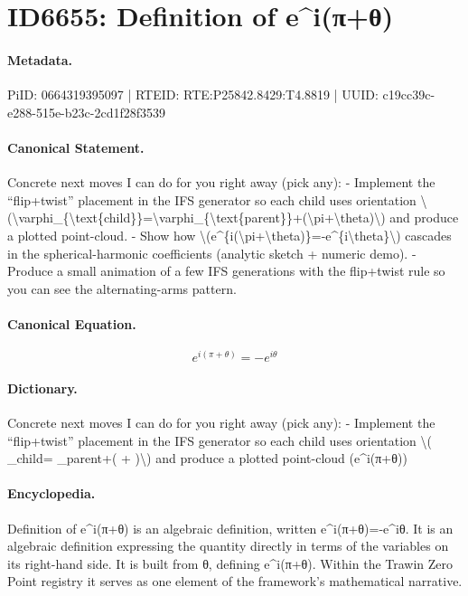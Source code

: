 \section*{ID6655: Definition of e\textasciicircum{}i(π+θ)}
\paragraph{Metadata.}
PiID: 0664319395097 | RTEID: RTE:P25842.8429:T4.8819 | UUID: c19cc39c-e288-515e-b23c-2cd1f28f3539

\paragraph{Canonical Statement.}
Concrete next moves I can do for you right away (pick any): - Implement the “flip+twist” placement in the IFS generator so each child uses orientation \textbackslash{}(\textbackslash{}varphi\_\{\textbackslash{}text\{child\}\}=\textbackslash{}varphi\_\{\textbackslash{}text\{parent\}\}+(\textbackslash{}pi+\textbackslash{}theta)\textbackslash{}) and produce a plotted point-cloud. - Show how \textbackslash{}(e\textasciicircum{}\{i(\textbackslash{}pi+\textbackslash{}theta)\}=-e\textasciicircum{}\{i\textbackslash{}theta\}\textbackslash{}) cascades in the spherical-harmonic coefficients (analytic sketch + numeric demo). - Produce a small animation of a few IFS generations with the flip+twist rule so you can see the alternating-arms pattern.

\paragraph{Canonical Equation.}
\[
e^{i(\pi+\theta)}=-e^{i\theta}
\]

\paragraph{Dictionary.}
Concrete next moves I can do for you right away (pick any): - Implement the “flip+twist” placement in the IFS generator so each child uses orientation \textbackslash{}( \_child= \_parent+( + )\textbackslash{}) and produce a plotted point-cloud (e\textasciicircum{}i(π+θ))

\paragraph{Encyclopedia.}
Definition of e\textasciicircum{}i(π+θ) is an algebraic definition, written e\textasciicircum{}i(π+θ)=-e\textasciicircum{}iθ. It is an algebraic definition expressing the quantity directly in terms of the variables on its right-hand side. It is built from θ, defining e\textasciicircum{}i(π+θ). Within the Trawin Zero Point registry it serves as one element of the framework's mathematical narrative.
